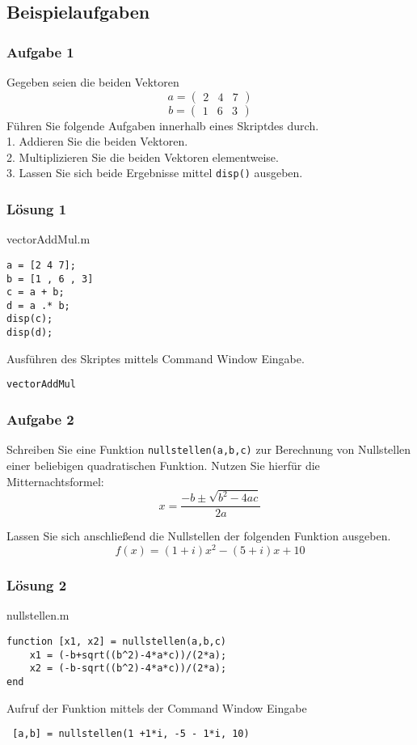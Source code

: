         \subsection{Beispielaufgaben}
        \subsubsection*{Aufgabe 1}
        Gegeben seien die beiden Vektoren 
        \[a=\begin{pmatrix}
                2 & 4 & 7
        \end{pmatrix}\]
        \[b=\begin{pmatrix}
                1 & 6 & 3
        \end{pmatrix}\]
        Führen Sie folgende Aufgaben innerhalb eines Skriptdes durch.\\
        1. Addieren Sie die beiden Vektoren.\\
        2. Multiplizieren Sie die beiden Vektoren elementweise.\\
        3. Lassen Sie sich beide Ergebnisse mittel \texttt{disp()} ausgeben.
        \subsubsection*{Lösung 1}
        \begin{Codelösung}{vectorAddMul.m}
                \begin{lstlisting}
a = [2 4 7];
b = [1 , 6 , 3]
c = a + b;
d = a .* b;
disp(c);
disp(d);
                \end{lstlisting}
        \end{Codelösung}
        \noindent Ausführen des Skriptes mittels Command Window Eingabe.
        \begin{center}
                \texttt{vectorAddMul}
        \end{center}
        \subsubsection*{Aufgabe 2}
        Schreiben Sie eine Funktion \texttt{nullstellen(a,b,c)} zur Berechnung von Nullstellen einer beliebigen quadratischen Funktion. Nutzen Sie hierfür die Mitternachtsformel:
        \[x = \frac{-b\pm \sqrt{b^2-4ac}}{2a}\]

        \noindent Lassen Sie sich anschließend die Nullstellen der folgenden Funktion ausgeben.
        \[ f(x) = (1+i)x^2 - (5+i)x + 10\]
        \subsubsection*{Lösung 2}
        \begin{Codelösung}{nullstellen.m}
                \begin{lstlisting}
function [x1, x2] = nullstellen(a,b,c)
    x1 = (-b+sqrt((b^2)-4*a*c))/(2*a); 
    x2 = (-b-sqrt((b^2)-4*a*c))/(2*a); 
end
                \end{lstlisting}
        \end{Codelösung}
        \noindent Aufruf der Funktion mittels der Command Window Eingabe
        \begin{center}
        \texttt{
[a,b] = nullstellen(1 +1*i, -5 - 1*i, 10)}
        \end{center}
